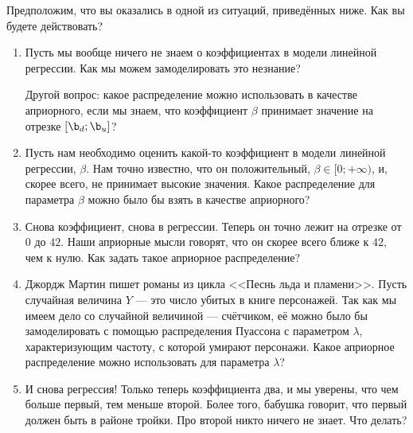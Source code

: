 \begin{problem}\label{upr1}
	
	Предположим, что вы оказались в одной из ситуаций, приведённых ниже. Как вы будете действовать?
	
	\begin{enumerate}
		
		\item Пусть мы вообще ничего не знаем о коэффициентах в модели линейной регрессии. Как мы можем замоделировать это незнание? 
		
		Другой вопрос: какое распределение можно использовать в качестве априорного, если мы знаем, что коэффициент $\beta$ принимает значение на отрезке $[\b_d; \b_u]$?
		
		\item Пусть нам необходимо оценить какой-то коэффициент в модели линейной регрессии, $\beta$. Нам точно известно, что он положительный, $\beta \in [0; +\infty)$, и, скорее всего, не принимает высокие значения. Какое распределение для параметра $\beta$ можно было бы взять в качестве априорного?
		
		\item Снова коэффициент, снова в регрессии. Теперь он точно лежит на отрезке от $0$ до $42$. Наши априорные мысли говорят, что он скорее всего ближе к $42$, чем к нулю. Как задать такое априорное распределение? 
		
		\item Джордж Мартин пишет романы из цикла <<Песнь льда и пламени>>. Пусть случайная величина $Y$ --- это число убитых в книге персонажей. Так как мы имеем дело со случайной величиной --- счётчиком, её можно было бы замоделировать с помощью распределения Пуассона с параметром $\lambda$, характеризующим частоту, с которой умирают персонажи. Какое априорное распределение можно использовать для параметра $\lambda$?
		
		\item И снова регрессия! Только теперь коэффициента два, и мы уверены, что чем больше первый, тем меньше второй. Более того, бабушка говорит, что первый должен быть в районе тройки. Про второй никто ничего не знает. Что делать? 
		
		
	\end{enumerate}
	

\end{problem}
